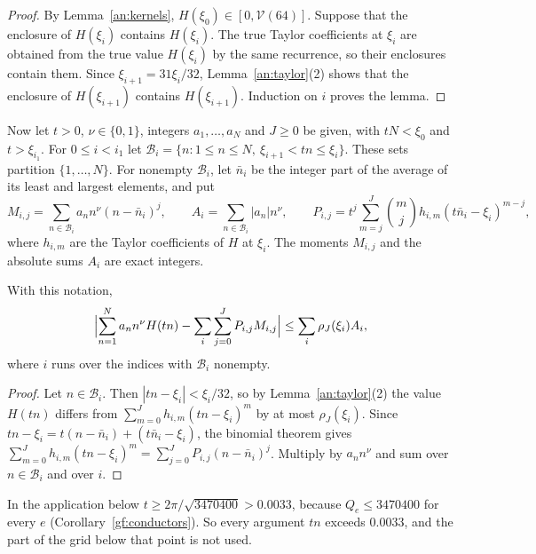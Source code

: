 \begin{proof}
By Lemma~\ref{an:kernels}, $H(\xi_0)\in[0,\mathcal V(64)]$. Suppose that
the enclosure of $H(\xi_i)$ contains $H(\xi_i)$. The true Taylor
coefficients at $\xi_i$ are obtained from the true value $H(\xi_i)$ by the
same recurrence, so their enclosures contain them. Since
$\xi_{i+1}=31\xi_i/32$, Lemma~\ref{an:taylor}(2) shows that the enclosure
of $H(\xi_{i+1})$ contains $H(\xi_{i+1})$. Induction on $i$ proves the
lemma.
\end{proof}

Now let $t>0$, $\nu\in\{0,1\}$, integers $a_1,\ldots,a_N$ and $J\ge0$ be
given, with $tN<\xi_0$ and $t>\xi_{i_1}$. For $0\le i<i_1$ let
$\mathcal B_i=\{n:1\le n\le N,\ \xi_{i+1}<tn\le\xi_i\}$. These sets
partition $\{1,\ldots,N\}$. For nonempty $\mathcal B_i$, let $\bar n_i$ be
the integer part of the average of its least and largest elements, and put
\[
 M_{i,j}=\sum_{n\in\mathcal B_i}a_nn^\nu(n-\bar n_i)^j,\qquad
 A_i=\sum_{n\in\mathcal B_i}|a_n|n^\nu,\qquad
 P_{i,j}=t^j\sum_{m=j}^J\binom mjh_{i,m}(t\bar n_i-\xi_i)^{m-j},
\]
where $h_{i,m}$ are the Taylor coefficients of $H$ at $\xi_i$. The moments
$M_{i,j}$ and the absolute sums $A_i$ are exact integers.

\begin{lemma}\label{an:binning}
With this notation,
\begin{equation}\label{an:bin-sum}
 \Bigl|\sum_{n=1}^Na_nn^\nu H(tn)-\sum_i\sum_{j=0}^JP_{i,j}M_{i,j}\Bigr|
 \le\sum_i\rho_J(\xi_i)A_i,
\end{equation}
where $i$ runs over the indices with $\mathcal B_i$ nonempty.
\end{lemma}

\begin{proof}
Let $n\in\mathcal B_i$. Then $|tn-\xi_i|<\xi_i/32$, so by
Lemma~\ref{an:taylor}(2) the value $H(tn)$ differs from
$\sum_{m=0}^Jh_{i,m}(tn-\xi_i)^m$ by at most $\rho_J(\xi_i)$. Since
$tn-\xi_i=t(n-\bar n_i)+(t\bar n_i-\xi_i)$, the binomial theorem gives
$\sum_{m=0}^Jh_{i,m}(tn-\xi_i)^m=\sum_{j=0}^JP_{i,j}(n-\bar n_i)^j$.
Multiply by $a_nn^\nu$ and sum over $n\in\mathcal B_i$ and over $i$.
\end{proof}

In the application below $t\ge2\pi/\sqrt{3470400}>0.0033$, because
$Q_e\le3470400$ for every $e$ (Corollary~\ref{gf:conductors}). So every argument
$tn$ exceeds $0.0033$, and the part of the grid below that point is not
used.

